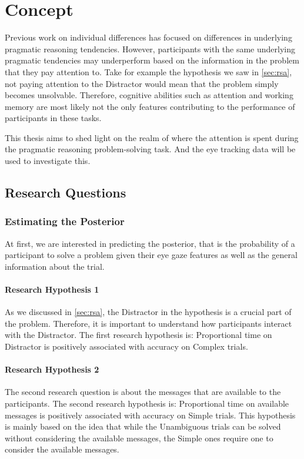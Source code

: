 ﻿\chapter{Concept}
 
Previous work on individual differences \citep{Franke_2016} has focused on differences in underlying pragmatic reasoning tendencies. However, participants with the same underlying pragmatic tendencies may underperform based on the information in the problem that they pay attention to. Take for example the hypothesis we saw in \autoref{sec:rsa}, not paying attention to the Distractor would mean that the problem simply becomes unsolvable. Therefore, cognitive abilities such as attention and working memory are most likely not the only features contributing to the performance of participants in these tasks.

This thesis aims to shed light on the realm of where the attention is spent during the pragmatic reasoning problem-solving task. And the eye tracking data will be used to investigate this. 

\section{Research Questions}
\label{sec:research_questions}

\subsection{Estimating the Posterior}
\label{sec:posterior}
At first, we are interested in predicting the posterior, that is the probability of a participant to solve a problem given their eye gaze features as well as the general information about the trial.

\subsubsection{Research Hypothesis 1}
\label{sec:h1}
As we discussed in \autoref{sec:rsa}, the Distractor in the hypothesis is a crucial part of the problem. Therefore, it is important to understand how participants interact with the Distractor. The first research hypothesis is: Proportional time on Distractor is positively associated with accuracy on Complex trials.

\subsubsection{Research Hypothesis 2}
\label{sec:h2}
The second research question is about the messages that are available to the participants. The second research hypothesis is: Proportional time on available messages is positively associated with accuracy on Simple trials. This hypothesis is mainly based on the idea that while the Unambiguous trials can be solved without considering the available messages, the Simple ones require one to consider the available messages.

